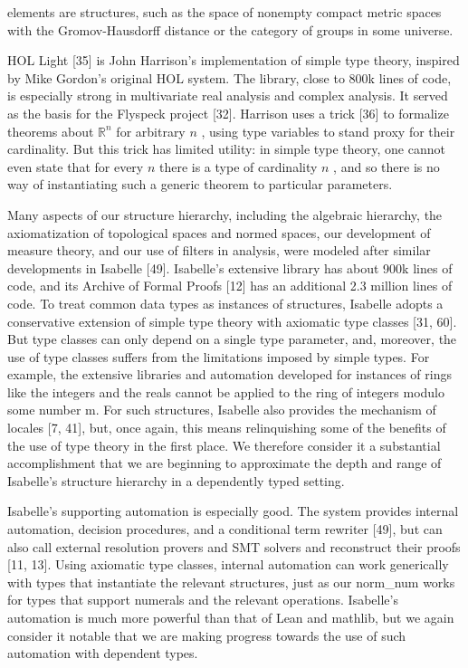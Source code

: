 \documentclass[
]{article}
\newcounter{none} %
\begin{document}
elements are structures, such as the space of nonempty compact metric
spaces with the Gromov-Hausdorff distance or the category of groups in
some universe.

HOL Light {[}35{]} is John Harrison's implementation of simple type
theory, inspired by Mike Gordon's original HOL system. The library,
close to 800k lines of code, is especially strong in multivariate real
analysis and complex analysis. It served as the basis for the Flyspeck
project {[}32{]}. Harrison uses a trick {[}36{]} to formalize theorems
about \(\mathbb{R}^n\) for arbitrary \(n\) , using type variables to
stand proxy for their cardinality. But this trick has limited utility:
in simple type theory, one cannot even state that for every \(n\) there
is a type of cardinality \(n\) , and so there is no way of instantiating
such a generic theorem to particular parameters.

Many aspects of our structure hierarchy, including the algebraic
hierarchy, the axiomatization of topological spaces and normed spaces,
our development of measure theory, and our use of filters in analysis,
were modeled after similar developments in Isabelle {[}49{]}. Isabelle's
extensive library has about 900k lines of code, and its Archive of
Formal Proofs {[}12{]} has an additional 2.3 million lines of code. To
treat common data types as instances of structures, Isabelle adopts a
conservative extension of simple type theory with axiomatic type classes
{[}31, 60{]}. But type classes can only depend on a single type
parameter, and, moreover, the use of type classes suffers from the
limitations imposed by simple types. For example, the extensive
libraries and automation developed for instances of rings like the
integers and the reals cannot be applied to the ring of integers modulo
some number m. For such structures, Isabelle also provides the mechanism
of locales {[}7, 41{]}, but, once again, this means relinquishing some
of the benefits of the use of type theory in the first place. We
therefore consider it a substantial accomplishment that we are beginning
to approximate the depth and range of Isabelle's structure hierarchy in
a dependently typed setting.

Isabelle's supporting automation is especially good. The system provides
internal automation, decision procedures, and a conditional term
rewriter {[}49{]}, but can also call external resolution provers and SMT
solvers and reconstruct their proofs {[}11, 13{]}. Using axiomatic type
classes, internal automation can work generically with types that
instantiate the relevant structures, just as our norm\_num works for
types that support numerals and the relevant operations. Isabelle's
automation is much more powerful than that of Lean and mathlib, but we
again consider it notable that we are making progress towards the use of
such automation with dependent types.
\end{document}
